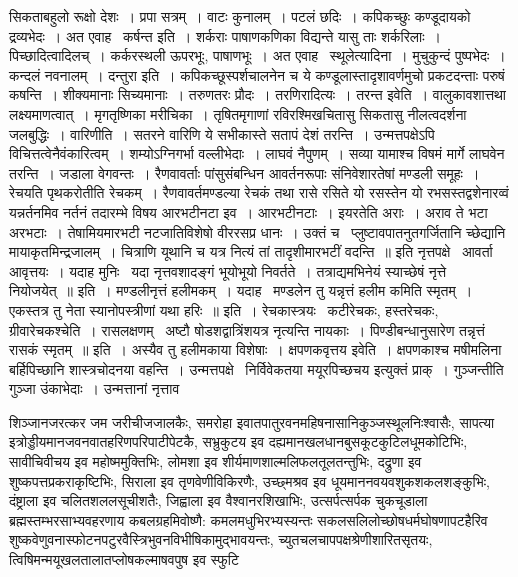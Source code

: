 \documentclass[11pt, openany]{book}
\begin{document}
\noindent
{\s सिकताबहुलो रूक्षो देशः~। प्रपा सत्रम्~। वाटः कुनालम्~। पटलं छदिः~। कपिकच्छुः कण्डूदायको द्रव्यभेदः~। अत एवाह \textendash\ {\qtt कर्षन्त इति}~। शर्कराः पाषाणकणिका विद्यन्ते यासु ताः शर्करिलाः~। पिच्छादित्वादिलच्~। कर्करस्थली ऊपरभूः, पाषाणभूः~। अत एवाह \textendash\ {\qtt स्थूलेत्यादिना}~। मुचुकुन्दं पुष्पभेदः~। कन्दलं नवनालम्~। {\qtt दन्तुरा इति}~। कपिकच्छूस्पर्शचालनेन च ये कण्डूलास्तादृशावर्णमुचो प्रकटदन्ताः परुषं कषन्ति~। शीक्यमानाः सिच्यमानाः~। तरुणतरः प्रौदः~। तरणिरादित्यः~। {\qtt तरन्त इवेति}~। वालुकावशात्तथा लक्ष्यमाणत्वात्~। मृगतृष्णिका मरीचिका~। तृषितमृगाणां रविरश्मिखचितासु सिकतासु नीलत्वदर्शना जलबुद्धिः~। {\qtt वारिणीति}~। सतरने वारिणि ये सभीकास्ते सतापं देशं तरन्ति~। उन्मत्तपक्षेऽपि विचित्तत्वेनैवंकारित्वम्~। शम्योऽग्निगर्भा वल्लीभेदाः~। लाघवं नैपुणम्~। सव्या यामाश्च विषमं मार्गे लाघवेन तरन्ति~। जडाला वेगवन्तः~। रैणवावर्ताः पांसुसंबन्धिन आवर्तनरूपाः संनिवेशारतेषां मण्डली समूहः~। रेचयति पृथकरोतीति रेचकम्~। रैणवावर्तमण्डल्या रेचकं तथा रासे रसिते यो रसस्तेन यो रभसस्तद्वशेनारव्वं यन्नर्तनमिव नर्तनं तदारम्भे विषय आरभटीनटा इव~। आरभटीनटाः~। इयरतेति अराः~। अराव ते भटा अरभटाः~। तेषामियमारभटी नटजातिविशेषो वीररसप्र धानः~। उक्तं च \textendash\ {\qt प्लुष्टावपातनुतगर्जितानि च्छेद्यानि मायाकृतमिन्द्रजालम्~। चित्राणि यूथानि च यत्र नित्यं तां तादृशीमारभटीं वदन्ति~॥} इति नृत्तपक्षे \textendash\ आवर्ता आवृत्तयः~। यदाह मुनिः \textendash\ {\qt यदा नृत्तवशादङ्गं भूयोभूयो निवर्तते~। तत्राद्यमभिनेयं स्याच्छेषं नृत्ते नियोजयेत्~॥} इति~। मण्डलीनृत्तं हलीमकम्~। यदाह \textendash\ {\qt मण्डलेन तु यन्नृत्तं हलीम कमिति स्मृतम्~। एकस्तत्र तु नेता स्यानोपस्त्रीणां यथा हरिः~॥} इति~। रेचकास्त्रयः \textendash\ कटीरेचकः, हस्तरेचकः, ग्रीवारेचकश्चेति~। रासलक्षणम् \textendash\ {\qt अष्टौ षोडशद्वात्रिंशयत्र नृत्यन्ति नायकाः~। पिण्डीबन्धानुसारेण तन्नृत्तं रासकं स्मृतम्~॥} इति~। अस्यैव तु हलीमकाया विशेषाः~। {\qtt क्षपणकवृत्तय इवेति}~। क्षपणकाश्च मषीमलिना बर्हिपिच्छानि शास्त्रचोदनया वहन्ति~। उन्मत्तपक्षे \textendash\ निर्विवेकतया मयूरपिच्छचय इत्युक्तं प्राक्~। गुञ्जन्तीति गुञ्जा उंकाभेदाः~। उन्मत्तानां नृत्ताव\textendash}

\newpage

\noindent
शिञ्जानजरत्कर जम जरीचीजजालकैः, समरोहा इवातपातुरवनमहिषनासानिकुञ्जस्थूलनिःश्वासैः, सापत्या इत्रोड्डीयमानजवनवातहरिणपरिपाटीपेटकै, सभ्रुकुटय इव दह्यमानखलधानबुसकूटकुटिलधूमकोटिभिः, सावीचिवीचय इव महोष्ममुक्तिभिः, लोमशा इव शीर्यमाणशाल्मलिफलतूलतन्तुभिः, दद्रुणा इव शुष्कपत्तप्रकराकृष्टिभिः, सिराला इव तृणवेणीविकिरणैः, उच्छ्मश्रव इव धूयमाननवयवशुकशकलशङ्कुभिः, दंष्ट्राला इव चलितशललसूचीशतैः, जिह्वाला इव वैश्वानरशिखाभिः, उत्सर्पत्सर्पक चुकचूडाला ब्रह्मस्तम्भरसाभ्यवहरणाय कबलग्रहमिवोष्णै: कमलमधुभिरभ्यस्यन्तः सकलसलिलोच्छोषधर्मघोषणापटहैरिव शुष्कवेणुवनास्फोटनपटुरवैस्त्रिभुवनविभीषिकामुद्भावयन्तः, च्युतचलचापपक्षश्रेणीशारितसृतयः, त्विषिमन्मयूखलतालातप्लोषकल्माषवपुष इव स्फुटि\textendash
\end{document}
